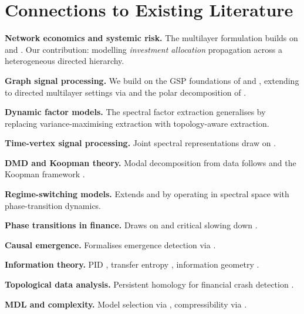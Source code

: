 \documentclass[11pt,a4paper]{article}
\theoremstyle{definition}
\begin{document}
\section{Connections to Existing Literature}
\label{sec:literature}

\textbf{Network economics and systemic risk.} The multilayer formulation builds on \citet{acemoglu2012network} and \citet{elliott2014financial,acemoglu2015systemic}. Our contribution: modelling \emph{investment allocation} propagation across a heterogeneous directed hierarchy.

\textbf{Graph signal processing.} We build on the GSP foundations of \citet{ortega2018graph} and \citet{sandryhaila2013discrete}, extending to directed multilayer settings via \citet{marques2020signal} and the polar decomposition of \citet{kwak2024polar}.

\textbf{Dynamic factor models.} The spectral factor extraction generalises \citet{stock2002macroeconomic,forni2000generalized} by replacing variance-maximising extraction with topology-aware extraction.

\textbf{Time-vertex signal processing.} Joint spectral representations draw on \citet{grassi2018time,perraudin2017stationary,loukas2019stationary}.

\textbf{DMD and Koopman theory.} Modal decomposition from data follows \citet{tu2014dynamic} and the Koopman framework \citep{brunton2022modern}.

\textbf{Regime-switching models.} Extends \citet{hamilton1989new} and \citet{kim1999state} by operating in spectral space with phase-transition dynamics.

\textbf{Phase transitions in finance.} Draws on \citet{sornette2003critical} and critical slowing down \citep{scheffer2009early,dakos2012methods}.

\textbf{Causal emergence.} Formalises emergence detection via \citet{hoel2013quantifying,hoel2017map,rosas2020reconciling}.

\textbf{Information theory.} PID \citep{williams2010nonnegative,lizier2018information}, transfer entropy \citep{schreiber2000measuring}, information geometry \citep{amari2016information}.

\textbf{Topological data analysis.} Persistent homology for financial crash detection \citep{carlsson2009topology,edelsbrunner2010computational}.

\textbf{MDL and complexity.} Model selection via \citet{rissanen1978modeling,grunwald2007minimum}, compressibility via \citet{lempel1976complexity,li2008introduction}.
\end{document}
